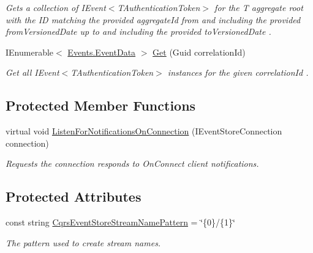 \begin{DoxyCompactItemize}
\begin{DoxyCompactList}\small\item\em Gets a collection of I\+Event$<$\+T\+Authentication\+Token$>$ for the {\itshape T} aggregate root with the ID matching the provided {\itshape aggregate\+Id}  from and including the provided {\itshape from\+Versioned\+Date}  up to and including the provided {\itshape to\+Versioned\+Date} . \end{DoxyCompactList}\item 
I\+Enumerable$<$ \hyperlink{classCqrs_1_1Events_1_1EventData}{Events.\+Event\+Data} $>$ \hyperlink{classCqrs_1_1EventStore_1_1EventStore_a898b51899af27db8aa0fb0c0dc75b25d_a898b51899af27db8aa0fb0c0dc75b25d}{Get} (Guid correlation\+Id)
\begin{DoxyCompactList}\small\item\em Get all I\+Event$<$\+T\+Authentication\+Token$>$ instances for the given {\itshape correlation\+Id} . \end{DoxyCompactList}\end{DoxyCompactItemize}
\subsection*{Protected Member Functions}
\begin{DoxyCompactItemize}
\item 
virtual void \hyperlink{classCqrs_1_1EventStore_1_1EventStore_add7396a800fe8f64c61406311e8fee1d_add7396a800fe8f64c61406311e8fee1d}{Listen\+For\+Notifications\+On\+Connection} (I\+Event\+Store\+Connection connection)
\begin{DoxyCompactList}\small\item\em Requests the {\itshape connection}  responds to On\+Connect client notifications. \end{DoxyCompactList}\end{DoxyCompactItemize}
\subsection*{Protected Attributes}
\begin{DoxyCompactItemize}
\item 
const string \hyperlink{classCqrs_1_1EventStore_1_1EventStore_ae9733f8511daf86ae3dac78bcbc5b2f0_ae9733f8511daf86ae3dac78bcbc5b2f0}{Cqrs\+Event\+Store\+Stream\+Name\+Pattern} = \char`\"{}\{0\}/\{1\}\char`\"{}
\begin{DoxyCompactList}\small\item\em The pattern used to create stream names. \end{DoxyCompactList}\end{DoxyCompactItemize}

